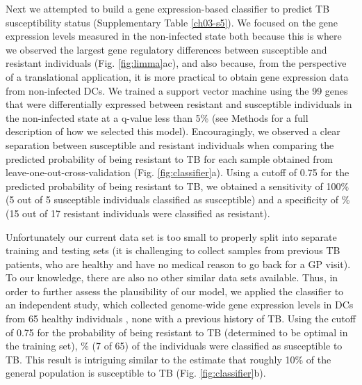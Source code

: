 Next we attempted to build a gene expression-based classifier to
predict TB susceptibility status (Supplementary Table \ref{ch03-s5}). We focused
on the gene expression levels measured in the non-infected state both
because this is where we observed the largest gene regulatory
differences between susceptible and resistant individuals (Fig.
\ref{fig:limma}ac), and also because, from the perspective of a
translational application, it is more practical to obtain gene
expression data from non-infected DCs. We trained a support vector
machine using the 99 genes that were differentially expressed between
resistant and susceptible individuals in the non-infected state at a
q-value less than 5\% (see Methods for a full description of how we
selected this model). Encouragingly, we observed a clear separation
between susceptible and resistant individuals when comparing the
predicted probability of being resistant to TB for each sample
obtained from leave-one-out-cross-validation (Fig.
\ref{fig:classifier}a). Using a cutoff of 0.75 for the predicted
probability of being resistant to TB, we obtained a sensitivity of
100\% (5 out of 5 susceptible individuals classified as susceptible)
and a specificity of \% (15 out of 17 resistant individuals
were classified as resistant).

Unfortunately our current data set is too small to properly split into
separate training and testing sets (it is challenging to collect
samples from previous TB patients, who are healthy and have no medical
reason to go back for a GP visit). To our knowledge, there are also no
other similar data sets available. Thus, in order to further assess
the plausibility of our model, we applied the classifier to an
independent study, which collected genome-wide gene expression levels
in DCs from 65 healthy individuals \citep{Barreiro2012}, none with a
previous history of TB. Using the cutoff of 0.75 for the probability
of being resistant to TB (determined to be optimal in the training
set), \% (7 of 65) of the individuals were classified
as susceptible to TB. This result is intriguing similar to the
estimate that roughly 10\% of the general population is susceptible to
TB (Fig. \ref{fig:classifier}b).

